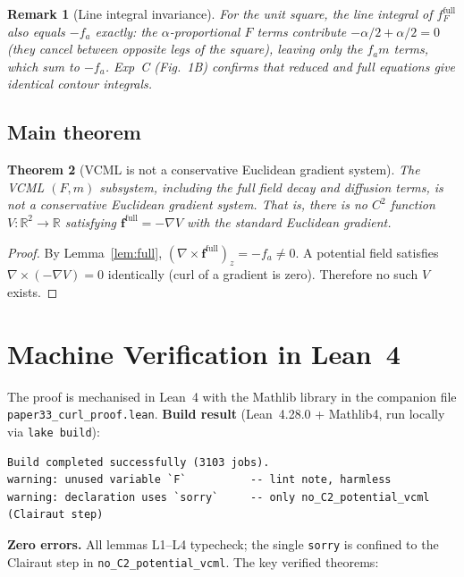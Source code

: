 \documentclass[11pt,a4paper]{article}
\newtheorem{theorem}{Theorem}[section]
\newtheorem{remark}[theorem]{Remark}
\begin{document}
\begin{remark}[Line integral invariance]
For the unit square, the line integral of $f_F^{\mathrm{full}}$ also equals
$-f_a$ exactly: the $\alpha$-proportional $F$ terms contribute
$-\alpha/2 + \alpha/2 = 0$ (they cancel between opposite legs of the square),
leaving only the $f_a m$ terms, which sum to $-f_a$.
Exp~C (Fig.~1B) confirms that reduced and full equations give identical
contour integrals.
\end{remark}

\subsection{Main theorem}

\begin{theorem}[VCML is not a conservative Euclidean gradient system]
\label{thm:main}
The VCML $(F, m)$ subsystem, including the full field decay and diffusion terms,
is not a conservative Euclidean gradient system.
That is, there is no $C^2$ function $V:\mathbb{R}^2\to\mathbb{R}$ satisfying
$\mathbf{f}^{\mathrm{full}} = -\nabla V$ with the standard Euclidean gradient.
\end{theorem}
\begin{proof}
By Lemma~\ref{lem:full}, $(\nabla\times\mathbf{f}^{\mathrm{full}})_z = -f_a \neq 0$.
A potential field satisfies $\nabla\times(-\nabla V) = 0$ identically
(curl of a gradient is zero).
Therefore no such $V$ exists.
\end{proof}

\section{Machine Verification in Lean~4}
\label{sec:lean}

The proof is mechanised in Lean~4 with the Mathlib library in the companion
file \texttt{paper33\_curl\_proof.lean}.
\textbf{Build result} (Lean~4.28.0 + Mathlib4, run locally via \texttt{lake build}):
\begin{verbatim}
Build completed successfully (3103 jobs).
warning: unused variable `F`          -- lint note, harmless
warning: declaration uses `sorry`     -- only no_C2_potential_vcml (Clairaut step)
\end{verbatim}
\textbf{Zero errors.} All lemmas L1--L4 typecheck; the single \texttt{sorry}
is confined to the Clairaut step in \texttt{no\_C2\_potential\_vcml}.
The key verified theorems:
\end{document}
